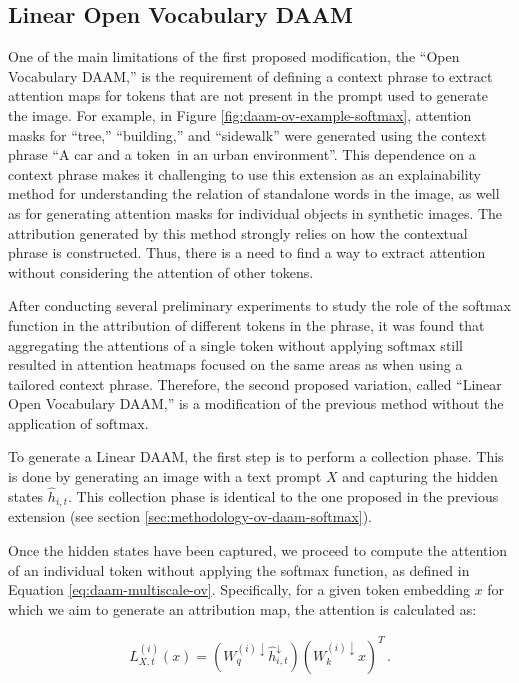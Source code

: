 \subsection{Linear Open Vocabulary DAAM}
\label{sec:methodology-ov-daam-linear}


One of the main limitations of the first proposed modification, the ``Open Vocabulary DAAM,'' is the requirement of defining a context phrase to extract attention maps for tokens that are not present in the prompt used to generate the image. For example, in Figure \ref{fig:daam-ov-example-softmax}, attention masks for ``tree,'' ``building,'' and ``sidewalk'' were generated using the context phrase ``A car and a \textlangle token\textrangle\ in an urban environment''. This dependence on a context phrase makes it challenging to use this extension as an explainability method for understanding the relation of standalone words in the image, as well as for generating attention masks for individual objects in synthetic images. The attribution generated by this method strongly relies on how the contextual phrase is constructed. Thus, there is a need to find a way to extract attention without considering the attention of other tokens.

After conducting several preliminary experiments to study the role of the softmax function in the attribution of different tokens in the phrase, it was found that aggregating the attentions of a single token without applying $\text{softmax}$ still resulted in attention heatmaps focused on the same areas as when using a tailored context phrase. Therefore, the second proposed variation, called ``Linear Open Vocabulary DAAM,'' is a modification of the previous method without the application of $\text{softmax}$.


To generate a Linear DAAM, the first step is to perform a collection phase. This is done by generating an image with a text prompt $X$ and capturing the hidden states $\hat{h}_{i,t}$. This collection phase is identical to the one proposed in the previous extension (see section \ref{sec:methodology-ov-daam-softmax}).


Once the hidden states have been captured, we proceed to compute the attention of an individual token without applying the softmax function, as defined in Equation \ref{eq:daam-multiscale-ov}. Specifically, for a given token embedding $x$ for which we aim to generate an attribution map, the attention is calculated as:

\begin{equation}
\label{eq:daam-multiscale-ov-linear}
\begin{gathered}
     L_{X,t}^{(i)} \left (x \right ) = (W_q^{(i)\downarrow} \hat{h}_{i, t}^{\downarrow})  (W_k^{(i)\downarrow} x )^T \, .
\end{gathered}
\end{equation}

